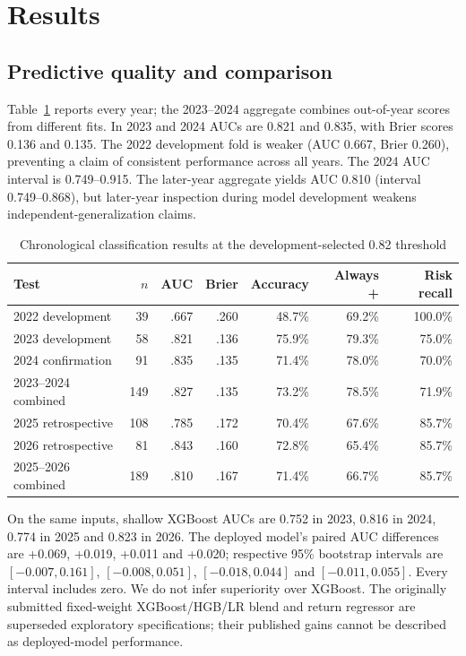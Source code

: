 \documentclass[runningheads]{llncs}
\begin{document}
\section{Results}
\subsection{Predictive quality and comparison}
Table~\ref{tab:performance} reports every year; the 2023--2024 aggregate combines out-of-year scores from different fits. In 2023 and 2024 AUCs are 0.821 and 0.835, with Brier scores 0.136 and 0.135. The 2022 development fold is weaker (AUC 0.667, Brier 0.260), preventing a claim of consistent performance across all years. The 2024 AUC interval is 0.749--0.915. The later-year aggregate yields AUC 0.810 (interval 0.749--0.868), but later-year inspection during model development weakens independent-generalization claims.
\begin{table}[tb]
\caption{Chronological classification results at the development-selected 0.82 threshold}\label{tab:performance}
\centering\small
\begin{tabular}{@{}lrrrrrr@{}}\toprule
Test & $n$ & AUC & Brier & Accuracy & Always + & Risk recall\\\midrule
2022 development & 39 & .667 & .260 & 48.7\% & 69.2\% & 100.0\%\\
2023 development & 58 & .821 & .136 & 75.9\% & 79.3\% & 75.0\%\\
2024 confirmation & 91 & .835 & .135 & 71.4\% & 78.0\% & 70.0\%\\
2023--2024 combined & 149 & .827 & .135 & 73.2\% & 78.5\% & 71.9\%\\
2025 retrospective & 108 & .785 & .172 & 70.4\% & 67.6\% & 85.7\%\\
2026 retrospective & 81 & .843 & .160 & 72.8\% & 65.4\% & 85.7\%\\
2025--2026 combined & 189 & .810 & .167 & 71.4\% & 66.7\% & 85.7\%\\\bottomrule
\end{tabular}
\end{table}
On the same inputs, shallow XGBoost AUCs are 0.752 in 2023, 0.816 in 2024, 0.774 in 2025 and 0.823 in 2026. The deployed model's paired AUC differences are +0.069, +0.019, +0.011 and +0.020; respective 95\% bootstrap intervals are $[-0.007,0.161]$, $[-0.008,0.051]$, $[-0.018,0.044]$ and $[-0.011,0.055]$. Every interval includes zero. We do not infer superiority over XGBoost. The originally submitted fixed-weight XGBoost/HGB/LR blend and return regressor are superseded exploratory specifications; their published gains cannot be described as deployed-model performance.
\end{document}
